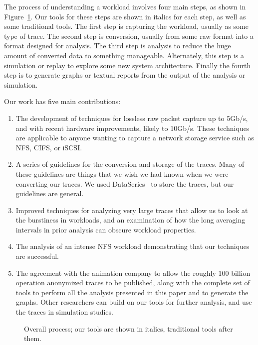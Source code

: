 The process of understanding a workload involves four main
steps, as shown in Figure~\ref{fig:overall-process}.  Our tools for
these steps are shown in italics for each step, as well as some
traditional tools.  The first step is capturing the workload, usually
as some type of trace.  The second step is conversion, usually from
some raw format into a format designed for analysis.  The third step
is analysis to reduce the huge amount of converted data to
something manageable.  Alternately, this step is a simulation or replay to
explore some new system architecture.  Finally the fourth step is to
generate graphs or textual reports from the output of the analysis or
simulation.

Our work has five main contributions:

\begin{enumerate}
\item The development of techniques for lossless raw packet capture up to
5Gb/s, and with recent hardware improvements, likely to
10Gb/s.  These techniques are applicable to anyone wanting to capture
a network storage service such as NFS, CIFS, or iSCSI.

\item A series of guidelines for the conversion and storage of the
traces.  Many of these guidelines are things that we wish we had known
when we were converting our traces.  We used
DataSeries~\cite{DataSeriesOSR2009} to store the traces, but our
guidelines are general.

\item Improved techniques for analyzing very large traces that allow
us to look at the burstiness in workloads, and an examination of how
the long averaging intervals in prior analysis can obscure workload
properties.

\item The analysis of an intense NFS workload demonstrating that our
techniques are successful.

\item The agreement with the animation company to allow the roughly
100 billion operation anonymized traces to be published, along with
the complete set of tools to perform all the analysis presented in
this paper and to generate the graphs.  Other
researchers can build on our tools for further analysis, and use
the traces in simulation studies.
\end{enumerate}

\begin{figure}
\center {}
\caption{Overall process; our tools are shown in italics, traditional tools
after them.}
\label{fig:overall-process}
\end{figure}


